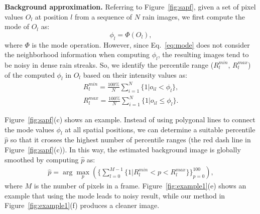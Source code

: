 \documentclass[10pt,twocolumn,letterpaper]{article}
\begin{document}
{\bf Background approximation.} Referring to Figure~\ref{fig:sapf}, given a set of pixel values $O_l$ at position $l$ from a sequence of $N$ rain images, we first compute the mode of $O_l$ as:
\begin{equation}
\phi_l = \Phi(O_l), \label{eq:mode}
\end{equation}
where $\Phi$ is the mode operation. However, since Eq.~\ref{eq:mode} does not consider the neighborhood information when computing $\phi_l$, the resulting images tend to be noisy in dense rain streaks. So, we identify the percentile range ($R_l^{min}$, $R_l^{max}$) of the computed $\phi_l$ in $O_l$ based on their intensity values as:
\begin{eqnarray}
\nonumber
R_l^{min} = \frac{100\%}{N}\sum_{i=1}^N \{1|o_{il} < \phi_l\},\\
R_l^{max} = \frac{100\%}{N}\sum_{i=1}^N \{1|o_{il} \leq \phi_l\}.
\end{eqnarray}

Figure~\ref{fig:sapf}(c) shows an example. Instead of using polygonal lines to connect the mode values $\phi_l$ at all spatial positions,
we can determine a suitable percentile $\hat{p}$ so that it crosses the highest number of percentile ranges (the red dash line in Figure~\ref{fig:sapf}(c)).
In this way, the estimated background image is globally smoothed by computing $\hat{p}$ as:
\begin{equation}
\begin{aligned}
\hat{p} = \arg\max_{p}(\{\sum_{l=0}^{M-1} \{1 |R_l^{min} < p<  R_l^{max}\}\}_{p=0}^{100}),
\end{aligned}
\end{equation}
where $M$ is the number of pixels in a frame. Figure~\ref{fig:example1}(e) shows an example that using the mode leads to noisy result, while our method in Figure~\ref{fig:example1}(f) produces a cleaner image.

\begin{figure*}[t]
	\centering
		\caption{A deraining example using a synthetic rain video of 100 frames. We show the best result of each method here. Refer to the supplementary for more results. }
		\label{fig:example1}
		\vspace{-3mm}
\end{figure*}
\end{document}
